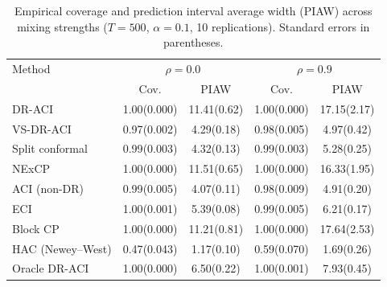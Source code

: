 \begin{table}[t]
\centering
\caption{Empirical coverage and prediction interval average width (PIAW) across mixing strengths ($T=500$, $\alpha=0.1$, 10 replications). Standard errors in parentheses.}
\label{tab:coverage}
\small
\begin{tabular}{lcccc}
\toprule
Method & \multicolumn{2}{c}{$\rho = 0.0$} & \multicolumn{2}{c}{$\rho = 0.9$} \\
 & Cov. & PIAW & Cov. & PIAW \\
\midrule
DR-ACI & 1.00\tiny{(0.000)} & 11.41\tiny{(0.62)} & 1.00\tiny{(0.000)} & 17.15\tiny{(2.17)} \\
VS-DR-ACI & 0.97\tiny{(0.002)} & 4.29\tiny{(0.18)} & 0.98\tiny{(0.005)} & 4.97\tiny{(0.42)} \\
Split conformal & 0.99\tiny{(0.003)} & 4.32\tiny{(0.13)} & 0.99\tiny{(0.003)} & 5.28\tiny{(0.25)} \\
NExCP & 1.00\tiny{(0.000)} & 11.51\tiny{(0.65)} & 1.00\tiny{(0.000)} & 16.33\tiny{(1.95)} \\
ACI (non-DR) & 0.99\tiny{(0.005)} & 4.07\tiny{(0.11)} & 0.98\tiny{(0.009)} & 4.91\tiny{(0.20)} \\
ECI & 1.00\tiny{(0.001)} & 5.39\tiny{(0.08)} & 0.99\tiny{(0.005)} & 6.21\tiny{(0.17)} \\
Block CP & 1.00\tiny{(0.000)} & 11.21\tiny{(0.81)} & 1.00\tiny{(0.000)} & 17.64\tiny{(2.53)} \\
HAC (Newey--West) & 0.47\tiny{(0.043)} & 1.17\tiny{(0.10)} & 0.59\tiny{(0.070)} & 1.69\tiny{(0.26)} \\
Oracle DR-ACI & 1.00\tiny{(0.000)} & 6.50\tiny{(0.22)} & 1.00\tiny{(0.001)} & 7.93\tiny{(0.45)} \\
\bottomrule
\end{tabular}
\end{table}